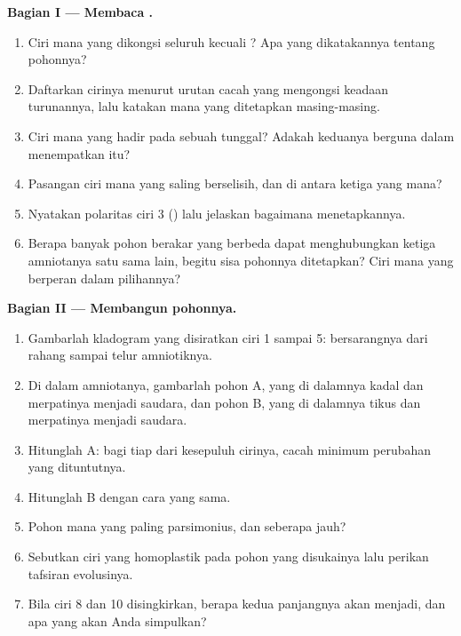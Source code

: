 \begin{problem}
\medskip
\noindent\textbf{Bagian I --- Membaca .}
\begin{enumerate}
  \item Ciri mana yang dikongsi seluruh  kecuali ? Apa yang dikatakannya tentang pohonnya?
  \item Daftarkan cirinya menurut urutan cacah  yang mengongsi
        keadaan turunannya, lalu katakan  mana yang ditetapkan
        masing-masing.
  \item Ciri mana yang hadir pada sebuah  tunggal? Adakah
        keduanya berguna dalam menempatkan  itu?
  \item Pasangan ciri mana yang saling berselisih, dan di antara ketiga
         yang mana?
  \item Nyatakan polaritas ciri 3 () lalu jelaskan bagaimana
         menetapkannya.
  \item Berapa banyak pohon berakar yang berbeda dapat menghubungkan
        ketiga amniotanya satu sama lain, begitu sisa pohonnya
        ditetapkan? Ciri mana yang berperan dalam pilihannya?
\end{enumerate}

\medskip
\noindent\textbf{Bagian II --- Membangun pohonnya.}
\begin{enumerate}[resume]
  \item Gambarlah kladogram yang disiratkan ciri 1 sampai 5: 
        bersarangnya dari rahang sampai telur amniotiknya.
  \item Di dalam amniotanya, gambarlah pohon A, yang di dalamnya kadal
        dan merpatinya menjadi  saudara, dan pohon B, yang di
        dalamnya tikus dan merpatinya menjadi saudara.
  \item Hitunglah  A: bagi tiap dari kesepuluh cirinya,
        cacah minimum perubahan yang dituntutnya.
  \item Hitunglah  B dengan cara yang sama.
  \item Pohon mana yang paling parsimonius, dan seberapa jauh?
  \item Sebutkan ciri yang homoplastik pada pohon yang disukainya lalu
        perikan tafsiran evolusinya.
  \item Bila ciri 8 dan 10 disingkirkan, berapa kedua panjangnya akan
        menjadi, dan apa yang akan Anda simpulkan?
\end{enumerate}


\end{problem}
